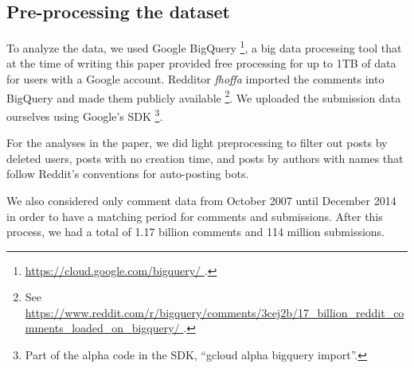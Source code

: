 \subsection{Pre-processing the dataset}

To analyze the data, we used Google BigQuery \footnote{\url{https://cloud.google.com/bigquery/ }.}, a big data processing tool that at the time of writing this paper provided free processing for up to 1TB of data for users with a Google account.  Redditor \textit{fhoffa} imported the comments into BigQuery and made them publicly available \footnote{See \url{https://www.reddit.com/r/bigquery/comments/3cej2b/17_billion_reddit_comments_loaded_on_bigquery/ }.}.  We uploaded the submission data ourselves using Google's SDK \footnote{Part of the alpha code in the SDK, ``gcloud alpha bigquery import''.}.

For the analyses in the paper, we did light preprocessing to filter out posts by deleted users, posts with no creation time, and posts by authors with names that follow Reddit's conventions for auto-posting bots. 

%

We also considered only comment data from October 2007 until December 2014 in order to have a matching period for comments and submissions. After this process, we had a total of 1.17 billion comments and 114 million submissions.


